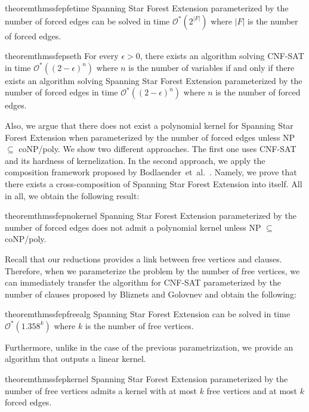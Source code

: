 \documentclass[en]{pracamgr}
\theoremstyle{definition}
\newcommand{\ssfep}{{\sc Spanning Star Forest Extension}}
\newcommand{\cnfsat}{{\sc CNF-SAT}}
\begin{document}
\begin{restatable}{theorem}{thmssfepfetime}\label{thm-ssfep-fe-time}
	\ssfep{} parameterized by the number of forced edges can be solved in time $\mathcal{O}^*(2^{|F|})$ where $|F|$ is the number of forced edges.
\end{restatable}

\begin{restatable}{theorem}{thmssfepseth}\label{thm-ssfep-seth}
	For every $\epsilon > 0$, there exists an algorithm solving \cnfsat{} in time $\mathcal{O}^*((2-\epsilon)^n)$ where $n$ is the number of variables if and only if there exists an algorithm solving \ssfep{} parameterized by the number of forced edges in time $\mathcal{O}^*((2-\epsilon)^n)$ where $n$ is the number of forced edges.
\end{restatable}

\noindent
Also, we argue that there does not exist a polynomial kernel for \ssfep{} when parameterized by the number of forced edges unless NP $\subseteq$ coNP/poly. We show two different approaches. The first one uses \cnfsat{} and its hardness of kernelization. In the second approach, we apply the composition framework proposed by Bodlaender~et~al.~\cite{Bodlaender}. Namely, we prove that there exists a cross-composition of \ssfep{} into itself. All in all, we obtain the following result:

\begin{restatable}{theorem}{thmssfepnokernel}\label{thm-ssfep-nokernel}
	\ssfep{} parameterized by the number of forced edges does not admit a polynomial kernel unless NP $\subseteq$ coNP/poly.
\end{restatable}

Recall that our reductions provides a link between free vertices and clauses. Therefore, when we parameterize the problem by the number of free vertices, we can immediately transfer the algorithm for \cnfsat{} parameterized by the number of clauses proposed by Bliznets and Golovnev \cite{MAXSAT} and obtain the following:

\begin{restatable}{theorem}{thmssfepfreealg}\label{thm-ssfep-free-alg}
	\ssfep{} can be solved in time $\mathcal{O}^*(1.358^k)$ where $k$ is the number of free vertices.
\end{restatable}

\noindent
Furthermore, unlike in the case of the previous parametrization, we provide an algorithm that outputs a linear kernel.

\begin{restatable}{theorem}{thmssfepkernel}\label{thm-ssfep-kernel}
	\ssfep{} parameterized by the number of free vertices admits a kernel with at most $k$ free vertices and at most $k$ forced edges.
\end{restatable}
\end{document}
